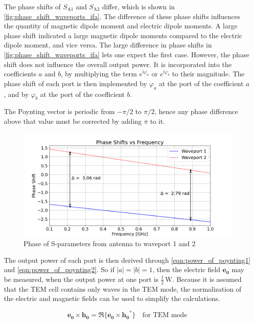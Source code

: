The phase shifts of $S_{\mathrm{A1}}$ and $S_{\mathrm{A2}}$ differ, which is shown in \autoref{fig:phase_shift_waveports_ifa}. The difference of these phase shifts influences the quantity of magnetic dipole moment and electric dipole moments. A large phase shift indicated a large magnetic dipole moments compared to the electric dipole moment, and vice versa. The large difference in phase shifts in \autoref{fig:phase_shift_waveports_ifa} lets one expect the first case. However, the phase shift does not influence the overall output power. It is incorporated into the coefficients $a$ and $b$, by multiplying the term $e^{\mathrm{i}\varphi_{a}}$ or $e^{\mathrm{i}\varphi_{b}}$ to their magnitude. The phase shift of each port is then implemented by $\varphi_{a}$ at the port of the coefficient $a$, and by $\varphi_{b}$ at the port of the coefficient $b$. 

The Poynting vector is periodic from $-\pi/2$ to $\pi/2$, hence any phase difference above that value must be corrected by adding $\pi$ to it. 

\begin{figure}[h]
    \centering
    \includegraphics[width=1\linewidth]{content//30_simulations//img/Phase Shift Waveports.png}
    \caption{Phase of S-parameters from antenna to waveport 1 and 2}
    \label{fig:phase_shift_waveports_ifa}
\end{figure}

The output power of each port is then derived through \autoref{eqn:power_of_poynting1} and \autoref{eqn:power_of_poynting2}. So if $|a|=|b|=1$, then the electric field $\mathbf{e_0}$ may be measured, when the output power at one port is $\frac{1}{2}\,\mathrm{W}$. Because it is assumed that the TEM cell contains only waves in the TEM mode, the normalization of the electric and magnetic fields can be used to simplify the calculations.

\begin{equation}
    \mathbf{e_0}\times\mathbf{h_0}=\Re\{\mathbf{e_0}\times\mathbf{h_0}^*\} \quad\text{for TEM mode}
    \label{eqn:equivalent_tem}
\end{equation}

